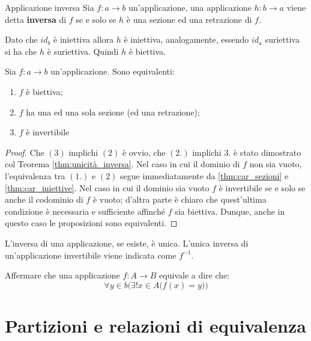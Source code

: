 \begin{defbox}{Applicazione inversa}
	Sia $f: a \longrightarrow b$ un'applicazione, una applicazione $h: b \longrightarrow a$ viene detta \textbf{inversa} di $f$ se e solo se $h$ è una sezione ed una retrazione di $f$.
\end{defbox}

Dato che $id_{b}$ è iniettiva allora $h$ è iniettiva, analogamente, essendo $id_{a}$ suriettiva si ha che $h$ è suriettiva. Quindi $h$ è biettiva.

\begin{teorbox}\label{thm:caratterizzazione_inverse}
	Sia $f: a \rightarrow b$ un'applicazione. Sono equivalenti:
	\begin{enumerate}
		\item $f$ è biettiva;
		\item $f$ ha una ed una sola sezione (ed una retrazione);
		\item $f$ è invertibile
	\end{enumerate}
\end{teorbox}
\begin{proof}
	Che $(3)$ implichi $(2)$ è ovvio, che $(2.)$ implichi $3.$ è stato dimostrato col Teorema \ref{thm:unicità_inversa}. Nel caso in cui
	il dominio di $f$ non sia vuoto, l’equivalenza tra $(1.)$ e $(2)$ segue immediatamente da \ref{thm:car_sezioni} e \ref{thm:car_iniettive}. Nel caso in cui il dominio sia vuoto $f$ è invertibile se e solo se anche il codominio di $f$ è vuoto; d’altra parte è chiaro che quest’ultima condizione è necessaria e sufficiente affinché $f$ sia biettiva. Dunque, anche in questo caso le proposizioni sono equivalenti.
\end{proof}

\begin{corolbox}
	L'inversa di una applicazione, se esiste, è unica. L'unica inversa di un'applicazione invertibile viene indicata come $f^{-1}$.
\end{corolbox}

\begin{corolbox}
	Affermare che una applicazione $f:A \longrightarrow B$ equivale a dire che:
	\begin{equation}
		\forall y \in b \biggl(\exists ! x \in A \bigl( f(x) = y \bigr)\biggr)
	\end{equation}
\end{corolbox}
\section{Partizioni e relazioni di equivalenza}

